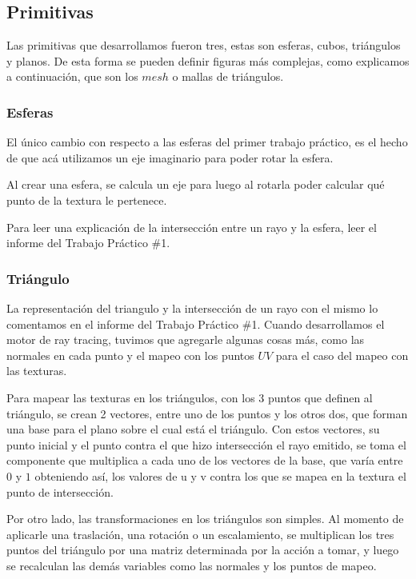\documentclass[a4paper,10pt]{article}
\begin{document}
\subsection{Primitivas}

Las primitivas que desarrollamos fueron tres, estas son esferas, cubos,
tri\'angulos y planos.  De esta forma se pueden definir figuras m\'as
complejas, como explicamos a continuaci\'on, que son los $mesh$ o mallas de
tri\'angulos.

\subsubsection{Esferas}

El \'unico cambio con respecto a las esferas del primer trabajo pr\'actico, es
el hecho de que ac\'a utilizamos un eje imaginario para poder rotar la esfera.

Al crear una esfera, se calcula un eje para luego al rotarla poder calcular
qu\'e punto de la textura le pertenece.

Para leer una explicaci\'on de la intersecci\'on entre un rayo y la esfera,
leer el informe del Trabajo Pr\'actico \#1.

\subsubsection{Tri\'angulo}
La representaci\'on del triangulo y la intersecci\'on de un rayo con el mismo
lo comentamos en el informe del Trabajo Pr\'actico \#1.  Cuando desarrollamos
el motor de ray tracing, tuvimos que agregarle algunas cosas m\'as, como las
normales en cada punto y el mapeo con los puntos $UV$ para el caso del mapeo
con las texturas.

Para mapear las texturas en los tri\'angulos, con los 3 puntos que definen al
tri\'angulo, se crean 2 vectores, entre uno de los puntos y los otros dos, que
forman una base para el plano sobre el cual est\'a el tri\'angulo.
Con estos vectores, su punto inicial y el punto contra el que hizo
intersecci\'on el rayo emitido, se toma el componente que multiplica a cada uno
de los vectores de la base, que var\'ia entre $0$ y $1$ obteniendo as\'i, los
valores de u y v contra los que se mapea en la textura el punto de
intersecci\'on.

Por otro lado, las transformaciones en los tri\'angulos son simples.  Al
momento de aplicarle una traslaci\'on, una rotaci\'on o un escalamiento, se
multiplican los tres puntos del tri\'angulo por una matriz determinada por la
acci\'on a tomar, y luego se recalculan las dem\'as variables como las normales
y los puntos de mapeo.
\end{document}
